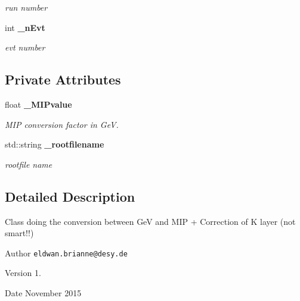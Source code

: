 \begin{DoxyCompactItemize}
\begin{DoxyCompactList}\small\item\em run number \end{DoxyCompactList}\item 
int {\bf \-\_\-n\-Evt}\label{classCALICE_1_1Ahc2MIP2GeVProcessor_a9cdc466f2b1bd0bbb10dc7e485652369}

\begin{DoxyCompactList}\small\item\em evt number \end{DoxyCompactList}\end{DoxyCompactItemize}
\subsection*{Private Attributes}
\begin{DoxyCompactItemize}
\item 
float {\bf \-\_\-\-M\-I\-Pvalue}\label{classCALICE_1_1Ahc2MIP2GeVProcessor_a30a2596fee76d2e4f13197348c432937}

\begin{DoxyCompactList}\small\item\em M\-I\-P conversion factor in Ge\-V. \end{DoxyCompactList}\item 
std\-::string {\bf \-\_\-rootfilename}\label{classCALICE_1_1Ahc2MIP2GeVProcessor_a7c0a3d4389476c59205c221b662762e6}

\begin{DoxyCompactList}\small\item\em rootfile name \end{DoxyCompactList}\end{DoxyCompactItemize}


\subsection{Detailed Description}
Class doing the conversion between Ge\-V and M\-I\-P + Correction of K layer (not smart!!) 

\begin{DoxyAuthor}{Author}
{\tt eldwan.\-brianne@desy.\-de} 
\end{DoxyAuthor}
\begin{DoxyVersion}{Version}
1. 
\end{DoxyVersion}
\begin{DoxyDate}{Date}
November 2015 
\end{DoxyDate}


